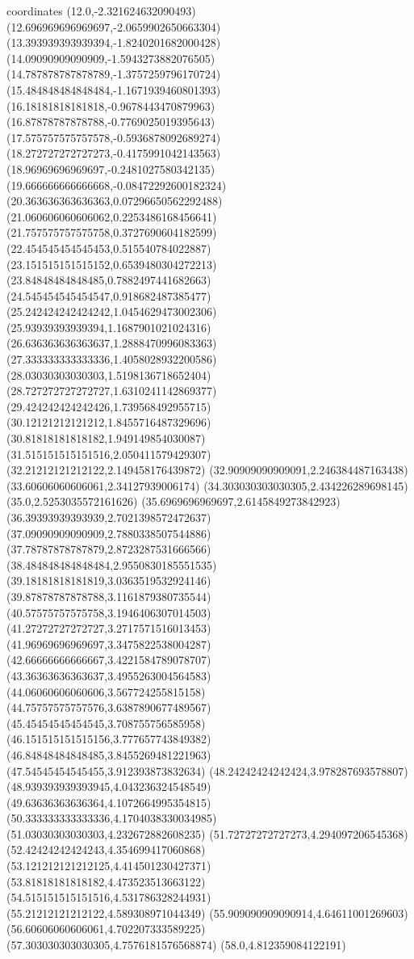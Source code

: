 coordinates {%
(12.0,-2.321624632090493)
(12.696969696969697,-2.0659902650663304)
(13.393939393939394,-1.8240201682000428)
(14.09090909090909,-1.5943273882076505)
(14.787878787878789,-1.3757259796170724)
(15.484848484848484,-1.1671939460801393)
(16.18181818181818,-0.9678443470879963)
(16.87878787878788,-0.7769025019395643)
(17.575757575757578,-0.5936878092689274)
(18.272727272727273,-0.4175991042143563)
(18.96969696969697,-0.2481027580342135)
(19.666666666666668,-0.08472292600182324)
(20.363636363636363,0.07296650562292488)
(21.060606060606062,0.2253486168456641)
(21.757575757575758,0.3727690604182599)
(22.454545454545453,0.515540784022887)
(23.151515151515152,0.6539480304272213)
(23.84848484848485,0.7882497441682663)
(24.545454545454547,0.918682487385477)
(25.242424242424242,1.0454629473002306)
(25.93939393939394,1.1687901021024316)
(26.636363636363637,1.2888470996083363)
(27.333333333333336,1.4058028932200586)
(28.03030303030303,1.5198136718652404)
(28.727272727272727,1.6310241142869377)
(29.424242424242426,1.739568492955715)
(30.12121212121212,1.8455716487329696)
(30.81818181818182,1.949149854030087)
(31.515151515151516,2.050411579429307)
(32.21212121212122,2.149458176439872)
(32.90909090909091,2.246384487163438)
(33.60606060606061,2.34127939006174)
(34.303030303030305,2.434226289698145)
(35.0,2.5253035572161626)
(35.6969696969697,2.6145849273842923)
(36.39393939393939,2.7021398572472637)
(37.09090909090909,2.7880338507544886)
(37.78787878787879,2.8723287531666566)
(38.484848484848484,2.9550830185551535)
(39.18181818181819,3.0363519532924146)
(39.87878787878788,3.1161879380735544)
(40.57575757575758,3.1946406307014503)
(41.27272727272727,3.2717571516013453)
(41.96969696969697,3.3475822538004287)
(42.66666666666667,3.4221584789078707)
(43.36363636363637,3.4955263004564583)
(44.06060606060606,3.567724255815158)
(44.75757575757576,3.6387890677489567)
(45.45454545454545,3.708755756585958)
(46.151515151515156,3.777657743849382)
(46.84848484848485,3.8455269481221963)
(47.54545454545455,3.912393873832634)
(48.24242424242424,3.978287693578807)
(48.939393939393945,4.043236324548549)
(49.63636363636364,4.1072664995354815)
(50.333333333333336,4.1704038330034985)
(51.03030303030303,4.232672882608235)
(51.72727272727273,4.294097206545368)
(52.42424242424243,4.354699417060868)
(53.121212121212125,4.414501230427371)
(53.81818181818182,4.473523513663122)
(54.515151515151516,4.531786328244931)
(55.21212121212122,4.589308971044349)
(55.909090909090914,4.64611001269603)
(56.60606060606061,4.702207333589225)
(57.303030303030305,4.7576181576568874)
(58.0,4.812359084122191)
}
